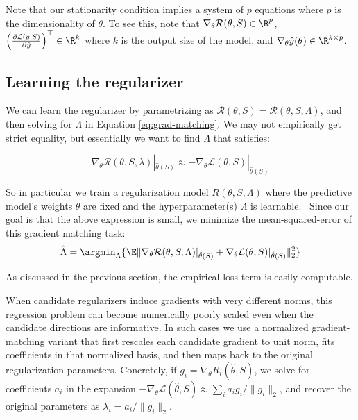 \documentclass[10pt]{article}
\begin{document}


Note that our stationarity condition implies a system of $p$ equations where $p$ is the dimensionality of $\theta$. To see this, note that $\nabla_\theta \mathcal{R}({\theta},S) \in \R^p$, $\left(\frac{\partial \mathcal{L}(\hat{y},S)}{\partial\hat{ y}}\right)^\top \in \R^k$ where $k$ is the output size of the model, and $\nabla_\theta{\hat{y}}({\theta}) \in \R^{k \times p}$.

\subsection{Learning the regularizer}
We can learn the regularizer by parametrizing as $\mathcal{R}(\theta,S) = \mathcal{R}(\theta,S,\Lambda)$, and then solving
for $\Lambda$ in Equation
\ref{eq:grad-matching}. We may not empirically get strict equality, but essentially we want to find $\Lambda$ that satisfies: 

\begin{equation*}
\nabla_\theta \mathcal{R}({\theta},S,\lambda)|_{\hat\theta(S)}
\approx - \nabla_\theta \mathcal{L}({\theta},S)|_{\hat\theta(S)}    
\end{equation*}


So in particular we train a regularization model $R({\theta}, S,\Lambda)$ where the predictive model's weights ${\theta}$ are fixed and the hyperparameter(s) $\Lambda$ is learnable. \
Since our goal is that the above expression is small, we minimize the mean-squared-error of this gradient matching task:
\[\hat{\Lambda} = \argmin_\Lambda \{ \E \| 
\nabla_\theta \mathcal{R}({\theta},S,\Lambda)|_{\hat\theta(S)}
+ 
\nabla_\theta \mathcal{L}({\theta},S)|_{\hat\theta(S)}  \|_2^2\} \]

As discussed in the previous section, the empirical loss term is easily computable.  

When candidate regularizers induce gradients with very different norms, this regression problem can become numerically poorly scaled even when the candidate directions are informative. In such cases we use a normalized gradient-matching variant that first rescales each candidate gradient to unit norm, fits coefficients in that normalized basis, and then maps back to the original regularization parameters. Concretely, if \(g_i = \nabla_\theta R_i(\hat\theta,S)\), we solve for coefficients \(a_i\) in the expansion \(-\nabla_\theta \mathcal{L}(\hat\theta,S) \approx \sum_i a_i g_i / \|g_i\|_2\), and recover the original parameters as \(\lambda_i = a_i / \|g_i\|_2\).
\end{document}
